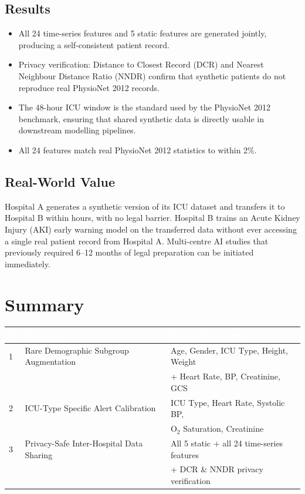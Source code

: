 \documentclass[12pt, a4paper]{article}
\begin{document}
\subsection{Results}

\begin{itemize}[itemsep=3pt]
    \item All 24 time-series features and 5 static features are generated
          jointly, producing a self-consistent patient record.
    \item Privacy verification: Distance to Closest Record (DCR) and
          Nearest Neighbour Distance Ratio (NNDR) confirm that synthetic
          patients do not reproduce real PhysioNet 2012 records.
    \item The 48-hour ICU window is the standard used by the PhysioNet 2012
          benchmark, ensuring that shared synthetic data is directly
          usable in downstream modelling pipelines.
    \item All 24 features match real PhysioNet 2012 statistics to within 2\%.
\end{itemize}

\subsection{Real-World Value}

Hospital A generates a synthetic version of its ICU dataset and transfers
it to Hospital B within hours, with no legal barrier. Hospital B trains
an Acute Kidney Injury (AKI) early warning model on the transferred data
without ever accessing a single real patient record from Hospital A.
Multi-centre AI studies that previously required 6--12 months of legal
preparation can be initiated immediately.

\section*{Summary}

\begin{table}[H]
\centering
\renewcommand{\arraystretch}{1.5}
\begin{tabularx}{\linewidth}{C{0.6cm} L{5.5cm} X}
\toprule
{}
\textcolor{white}{\textbf{\#}} &
\textcolor{white}{\textbf{Use Case}} &
\textcolor{white}{\textbf{Key features used}} \\
\midrule
{}
1 & Rare Demographic Subgroup Augmentation &
Age, Gender, ICU Type, Height, Weight\\
& & + Heart Rate, BP, Creatinine, GCS \\
2 & ICU-Type Specific Alert Calibration &
ICU Type, Heart Rate, Systolic BP, \\
& & O$_2$ Saturation, Creatinine \\
3 & Privacy-Safe Inter-Hospital Data Sharing &
All 5 static + all 24 time-series features \\
& & + DCR \& NNDR privacy verification \\
\bottomrule
\end{tabularx}
\end{table}
\end{document}
